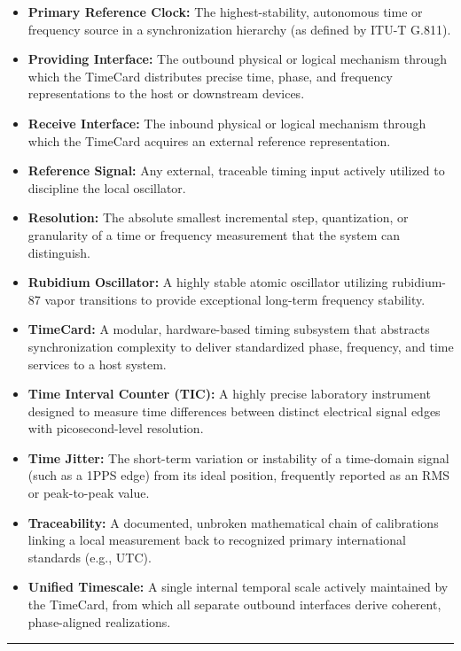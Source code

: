 \documentclass[
]{article}
\begin{document}
\begin{itemize}
\item
  \textbf{Primary Reference Clock:} The highest-stability, autonomous
  time or frequency source in a synchronization hierarchy (as defined by
  ITU-T G.811).
\item
  \textbf{Providing Interface:} The outbound physical or logical
  mechanism through which the TimeCard distributes precise time, phase,
  and frequency representations to the host or downstream devices.
\item
  \textbf{Receive Interface:} The inbound physical or logical mechanism
  through which the TimeCard acquires an external reference
  representation.
\item
  \textbf{Reference Signal:} Any external, traceable timing input
  actively utilized to discipline the local oscillator.
\item
  \textbf{Resolution:} The absolute smallest incremental step,
  quantization, or granularity of a time or frequency measurement that
  the system can distinguish.
\item
  \textbf{Rubidium Oscillator:} A highly stable atomic oscillator
  utilizing rubidium-87 vapor transitions to provide exceptional
  long-term frequency stability.
\item
  \textbf{TimeCard:} A modular, hardware-based timing subsystem that
  abstracts synchronization complexity to deliver standardized phase,
  frequency, and time services to a host system.
\item
  \textbf{Time Interval Counter (TIC):} A highly precise laboratory
  instrument designed to measure time differences between distinct
  electrical signal edges with picosecond-level resolution.
\item
  \textbf{Time Jitter:} The short-term variation or instability of a
  time-domain signal (such as a 1PPS edge) from its ideal position,
  frequently reported as an RMS or peak-to-peak value.
\item
  \textbf{Traceability:} A documented, unbroken mathematical chain of
  calibrations linking a local measurement back to recognized primary
  international standards (e.g., UTC).
\item
  \textbf{Unified Timescale:} A single internal temporal scale actively
  maintained by the TimeCard, from which all separate outbound
  interfaces derive coherent, phase-aligned realizations.
\end{itemize}

\begin{center}\rule{0.5\linewidth}{0.5pt}\end{center}
\end{document}

